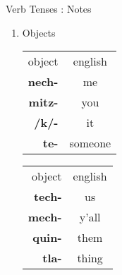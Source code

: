\documentclass[12pt]{beamer}
\begin{document}
\begin{frame}
\begin{columns}[t]
\begin{column}{.23\linewidth}
\begin{block}{Verb Tenses : Notes}
\begin{enumerate}
    			\item Objects \newline
   				\begin{tabular}[t]{r|c|}
   					object		   & english	\\
   					\cline{1-2}
   					\textbf{nech-} & me				\\
   					\textbf{mitz-} & you		 	\\
   					\textbf{/k/-}  & it				\\
   					\textbf{te-}  & someone		 	\\
   				\end{tabular}%
   				\begin{tabular}[t]{|r|c}
   					object		   & english	\\
   					\cline{1-2}
   					\textbf{tech-} & us				\\
   					\textbf{mech-} & y'all			\\
   					\textbf{quin-} & them			\\
   					\textbf{tla-}  & thing		 	\\
   				\end{tabular}%
    		\end{enumerate}
    		

\end{block}
\end{column}
\end{columns}
\end{frame}
\end{document}
